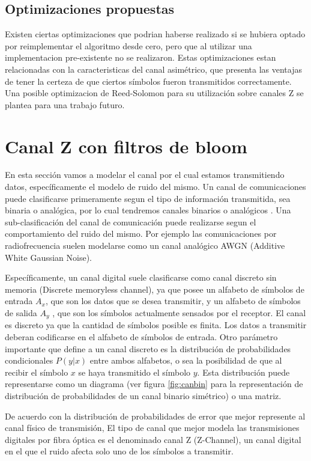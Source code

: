 \subsection{Optimizaciones propuestas}
 
Existen ciertas optimizaciones que podrian haberse realizado si se hubiera optado por reimplementar el algoritmo desde cero, pero que al utilizar una implementacion pre-existente no se realizaron. Estas optimizaciones estan relacionadas con la caracteristicas del canal asimétrico, que presenta las ventajas de tener la certeza de que ciertos símbolos fueron transmitidos correctamente. Una posible optimizacion de Reed-Solomon para su utilización sobre canales Z se plantea para una trabajo futuro.

\section{Canal Z con filtros de bloom}

En esta sección vamos a modelar el canal por el cual estamos transmitiendo datos, específicamente el modelo de ruido del mismo. 
Un canal de comunicaciones puede clasificarse primeramente segun el tipo de información transmitida, sea binaria o analógica, por lo cual tendremos canales binarios o analógicos \cite{MacKay:2002}.
Una sub-clasificación del canal de comunicación puede realizarse segun el comportamiento del ruido del mismo.
Por ejemplo las comunicaciones por radiofrecuencia suelen modelarse como un canal analógico AWGN (Additive White Gaussian Noise). 

Específicamente, un canal digital suele clasificarse como canal discreto sin memoria (Discrete memoryless channel), ya que posee un alfabeto de símbolos de entrada $A_{x}$, que son los datos que se desea transmitir, y un alfabeto de símbolos de salida $A_{y}$ , que son los símbolos actualmente sensados por el receptor. El canal es discreto ya que la cantidad de símbolos posible es finita. Los datos a transmitir deberan codificarse en el alfabeto de símbolos de entrada.
Otro parámetro importante que define a un canal discreto es la distribución de probabilidades condicionales $P(y|x)$ entre ambos alfabetos, o sea la posibilidad de que al recibir el símbolo $x$ se haya transmitido el símbolo $y$. Esta distribución puede representarse como un diagrama (ver figura \ref{fig:canbin} para la representación de distribución de probabilidades de un canal binario simétrico) o una matriz.

De acuerdo con la distribución de probabilidades de error que mejor represente al canal físico de transmisión, 
El tipo de canal que mejor modela las transmisiones digitales por fibra óptica es el denominado canal Z (Z-Channel), un canal digital en el que el ruido afecta solo uno de los símbolos a transmitir.

